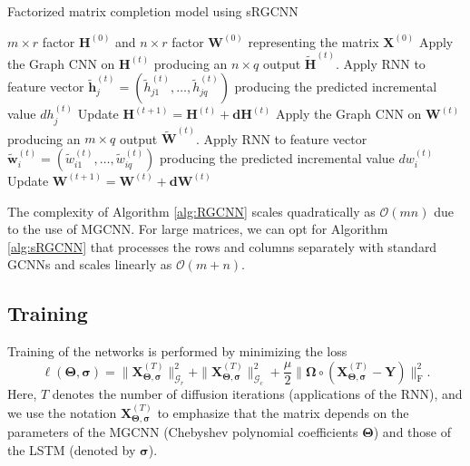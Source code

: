 \documentclass{article}
\begin{document}
\begin{algorithm}[!t]
\caption{Factorized matrix completion model using sRGCNN}\label{alg:sRGCNN}
\begin{algorithmic}[1]
\INPUT $m\times r$ factor $\mathbf{H}^{(0)}$ and $n\times r$ factor $\mathbf{W}^{(0)}$ representing the matrix $\mathbf{X}^{(0)}$
	\STATE Apply the Graph CNN on $\mathbf{H}^{(t)}$ producing an $n \times q$ output $\tilde{\mathbf{H}}^{(t)}$.
		\STATE Apply RNN to feature vector $\tilde{\mathbf{h}}^{(t)}_j = (\tilde{h}^{(t)}_{j1}, \hdots, \tilde{h}^{(t)}_{jq})$ producing the predicted incremental value $dh^{(t)}_{j}$
\ENDFOR
	\STATE Update $\mathbf{H}^{(t+1)} = \mathbf{H}^{(t)} + \mathbf{dH}^{(t)}$
\STATE Apply the Graph CNN on $\mathbf{W}^{(t)}$ producing an $m \times q$ output $\tilde{\mathbf{W}}^{(t)}$.
		\STATE Apply RNN to feature vector $\tilde{\mathbf{w}}^{(t)}_i = (\tilde{w}^{(t)}_{i1}, \hdots, \tilde{w}^{(t)}_{iq})$ producing the predicted incremental value $dw^{(t)}_{i}$
\ENDFOR
	\STATE Update $\mathbf{W}^{(t+1)} = \mathbf{W}^{(t)} + \mathbf{dW}^{(t)}$
\ENDFOR
\end{algorithmic}
\end{algorithm}




The complexity of Algorithm \ref{alg:RGCNN} scales quadratically as $\mathcal{O}(mn)$ due to the use of MGCNN. For large matrices, we can opt for Algorithm \ref{alg:sRGCNN} that processes the rows and columns separately with standard GCNNs and scales linearly as $\mathcal{O}(m+n)$. 










 

\subsection{Training}
Training of the networks is performed by minimizing the loss 
\begin{equation}
\ell(\boldsymbol{\Theta},\boldsymbol{\sigma}) = 
\| \mathbf{X}^{(T)}_{\boldsymbol{\Theta},\boldsymbol{\sigma}} \|_{\mathcal{G}_r}^2 + \| \mathbf{X}^{(T)}_{\boldsymbol{\Theta},\boldsymbol{\sigma}} \|_{\mathcal{G}_c}^2 + \frac{\mu}{2} \| \boldsymbol{\Omega}\circ (\mathbf{X}^{(T)}_{\boldsymbol{\Theta},\boldsymbol{\sigma}} - \mathbf{Y}) \|_\mathrm{F}^2. 
\end{equation}
Here, $T$ denotes the number of diffusion iterations (applications of the RNN), and we use the notation $\mathbf{X}^{(T)}_{\boldsymbol{\Theta},\boldsymbol{\sigma}}$ to emphasize that the matrix depends on the parameters of the MGCNN (Chebyshev polynomial coefficients $\boldsymbol{\Theta}$) and those of the LSTM (denoted by $\boldsymbol{\sigma}$). 
\end{document}
